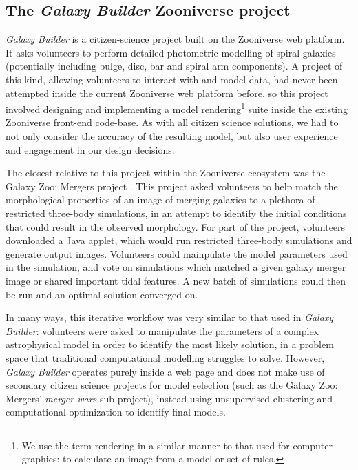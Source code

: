 \documentclass[../main.tex]{subfiles}
\begin{document}
\label{sec:method}

\subsection{The \textit{Galaxy Builder} Zooniverse project}

\textit{Galaxy Builder} is a citizen-science project built on the Zooniverse web platform. It asks volunteers to perform detailed photometric modelling of spiral galaxies (potentially including bulge, disc, bar and spiral arm components). A project of this kind, allowing volunteers to interact with and model data, had never been attempted inside the current Zooniverse web platform before, so this project involved designing and implementing a model rendering\footnote{We use the term rendering in a similar manner to that used for computer graphics: to calculate an image from a model or set of rules.} suite inside the existing Zooniverse front-end code-base. As with all citizen science solutions, we had to not only consider the accuracy of the resulting model, but also user experience and engagement in our design decisions.

The closest relative to this project within the Zooniverse ecosystem was the Galaxy Zoo: Mergers project \citep{Holincheck2016:1604.00435v1}. This project asked volunteers to help match the morphological properties of an image of merging galaxies to a plethora of restricted three-body simulations, in an attempt to identify the initial conditions that could result in the observed morphology. For part of the project, volunteers downloaded a Java applet, which would run restricted three-body simulations and generate output images. Volunteers could mainpulate the model parameters used in the simulation, and vote on simulations which matched a given galaxy merger image or shared important tidal features. A new batch of simulations could then be run and an optimal solution converged on.

In many ways, this iterative workflow was very similar to that used in \textit{Galaxy Builder}: volunteers were asked to manipulate the parameters of a complex astrophysical model in order to identify the most likely solution, in a problem space that traditional computational modelling struggles to solve. However, \textit{Galaxy Builder} operates purely inside a web page and does not make use of secondary citizen science projects for model selection (such as the Galaxy Zoo: Mergers' \textit{merger wars} sub-project), instead using unsupervised clustering and computational optimization to identify final models.
\end{document}
